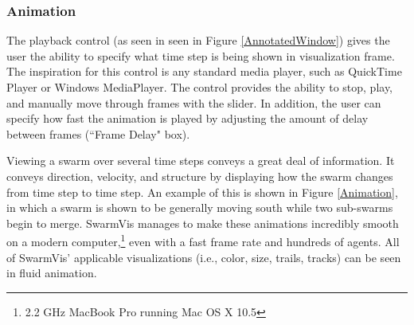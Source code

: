 \documentclass{vgtc}
\begin{document}
\subsubsection{Animation}

The playback control (as seen in  seen in Figure \ref{AnnotatedWindow})
gives the user the ability to specify what time step is being shown in visualization frame.
The inspiration for this control is any standard media player, such as QuickTime Player or Windows MediaPlayer.
The control provides the ability to stop, play, and manually move through frames with the slider.
In addition, the user can specify how fast the animation is played by adjusting the amount of delay between
frames (``Frame Delay" box).

Viewing a swarm over several time steps conveys a great deal of information.
It conveys direction, velocity, and structure by displaying how the swarm changes from time step to time step.
An example of this is shown in Figure \ref{Animation}, in which a swarm is shown to be
generally moving south while two sub-swarms begin to merge.
SwarmVis manages to make these animations incredibly smooth on a modern
computer,\footnote{2.2 GHz MacBook Pro running Mac OS X 10.5} even with a fast frame rate and hundreds of agents.
All of SwarmVis' applicable visualizations (i.e., color, size, trails, tracks) can be seen in fluid animation.
\end{document}
